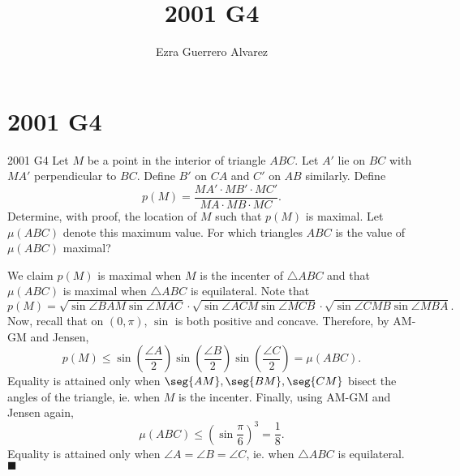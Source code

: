 \documentclass[14pt]{article}
\title{2001 G4}
\author{Ezra Guerrero Alvarez}
\begin{document}
\maketitle
	
\section*{2001 G4}

\begin{statement}{2001 G4}
	Let $M$ be a point in the interior of triangle $ABC$. Let $A'$ lie on $BC$ with $MA'$ perpendicular to $BC$. Define $B'$ on $CA$ and $C'$ on $AB$ similarly.  Define
	\[ p(M) = \frac{MA' \cdot MB' \cdot MC'}{MA \cdot MB \cdot MC}. \]
	Determine, with proof, the location of $M$ such that $p(M)$ is maximal.  Let $\mu(ABC)$ denote this maximum value.  For which triangles $ABC$ is the value of $\mu(ABC)$ maximal?
\end{statement}
We claim $p(M)$ is maximal when $M$ is the incenter of $\triangle ABC$ and that $\mu(ABC)$ is maximal when $\triangle ABC$ is equilateral. Note that
\[ p(M)=\sqrt{\sin\angle BAM\sin\angle MAC}\cdot\sqrt{\sin\angle ACM\sin\angle MCB}\cdot\sqrt{\sin\angle CMB\sin\angle MBA}. \]
Now, recall that on $(0,\pi)$, $\sin$ is both positive and concave. Therefore, by AM-GM and Jensen,
\[ p(M)\le\sin\left(\frac{\angle A}2\right)\sin\left(\frac{\angle B}2\right)\sin\left(\frac{\angle C}2\right)=\mu(ABC). \]
Equality is attained only when $\seg{AM},\seg{BM},\seg{CM}$ bisect the angles of the triangle, ie. when $M$ is the incenter. Finally, using AM-GM and Jensen again,
\[ \mu(ABC)\le\left(\sin\frac\pi6\right)^3=\frac18. \]
Equality is attained only when $\angle A=\angle B=\angle C$, ie. when $\triangle ABC$ is equilateral. $\blacksquare$
	
\end{document}
